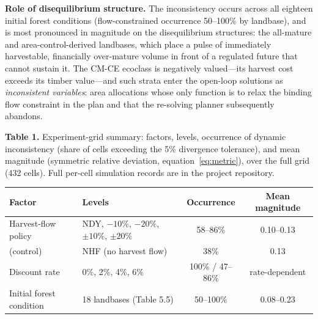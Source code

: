 \textbf{Role of disequilibrium structure.} The inconsistency occurs across all eighteen initial forest conditions (flow-constrained occurrence 50--100\% by landbase), and is most pronounced in magnitude on the disequilibrium structures: the all-mature and area-control-derived landbases, which place a pulse of immediately harvestable, financially over-mature volume in front of a regulated future that cannot sustain it. The CM-CE ecoclass is negatively valued---its harvest cost exceeds its timber value---and such strata enter the open-loop solutions as \emph{inconsistent variables}: area allocations whose only function is to relax the binding flow constraint in the plan and that the re-solving planner subsequently abandons.

\textbf{Table 1.} Experiment-grid summary: factors, levels, occurrence of dynamic inconsistency (share of cells exceeding the 5\% divergence tolerance), and mean magnitude (symmetric relative deviation, equation~\eqref{eq:metric}), over the full grid (432 cells). Full per-cell simulation records are in the project repository.

\begin{table}[h]
\centering
\small
\begin{tabular}{@{}llcc@{}}
\toprule
Factor & Levels & Occurrence & Mean magnitude \\
\midrule
Harvest-flow policy & NDY, $-10\%$, $-20\%$, $\pm10\%$, $\pm20\%$ & 58--86\% & 0.10--0.13 \\
\quad (control) & NHF (no harvest flow) & 38\% & 0.13 \\
Discount rate & 0\%, 2\%, 4\%, 6\% & 100\% / 47--86\% & rate-dependent \\
Initial forest condition & 18 landbases (Table 5.5) & 50--100\% & 0.08--0.23 \\
\bottomrule
\end{tabular}
\end{table}
